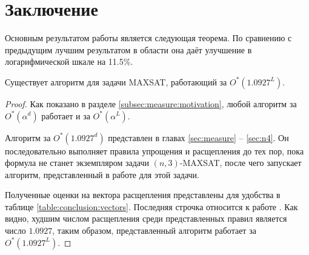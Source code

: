 
\section*{Заключение}
\label{sec:conclusion}

Основным результатом работы является следующая теорема. По сравнению с предыдущим лучшим результатом в области \cite{bansal99} она даёт улучшение в логарифмической шкале на 11.5\%.

\setcounter{section}{5}
\setcounter{lemma}{0}
\begin{theorem}
 Существует алгоритм для задачи MAXSAT, работающий за $O^*(1.0927^L)$.
\end{theorem}

\begin{proof}
 Как показано в разделе \ref{subsec:measure:motivation}, любой алгоритм за $O^*(\alpha^d)$ работает и за $O^*(\alpha^L)$.

 Алгоритм за $O^*(1.0927^d)$ представлен в главах \ref{sec:measure} -- \ref{sec:n4}. Он последовательно выполняет правила упрощения и расщепления до тех пор, пока формула не станет экземпляром задачи $(n,3)$-MAXSAT, после чего запускает алгоритм, представленный в работе \cite{belova18} для этой задачи.

 Полученные оценки на вектора расщепления представлены для удобства в таблице \ref{table:conclusion:vectors}. Последняя строчка относится к работе \cite{belova18}. Как видно, худшим числом расщепления среди представленных правил является число $1.0927$, таким образом, представленный алгоритм работает за $O^*(1.0927^L)$.
\end{proof}

